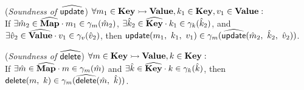 \begin{thm} \normalfont
(\textit{Soundness of} $\widehat{\textsf{update}}$) 
$\forall m_1 \in \textbf{Key} \rightarrowtail \textbf{Value}, k_1 \in \textbf{Key}, v_1 \in \textbf{Value} :$\\
If $\exists \hat{m}_2 \in \widehat{\textbf{Map}} \cdot m_1 \in \gamma_m(\hat{m}_2)$,
$\exists \hat{k}_2 \in \widehat{\textbf{Key}} \cdot k_1 \in \gamma_k(\hat{k}_2)$,
and $\exists \hat{v}_2 \in \widehat{\textbf{Value}} \cdot v_1 \in \gamma_v(\hat{v}_2)$,
then $\textsf{update}(m_1,\ k_1,\ v_1) \in \gamma_m(\widehat{\textsf{update}}(\hat{m}_2,\ \hat{k}_2,\ \hat{v}_2))$.
\end{thm}


\begin{thm} \normalfont
(\textit{Soundness of} $\widehat{\textsf{delete}}$) 
$\forall m \in \textbf{Key} \rightarrowtail \textbf{Value}, k \in \textbf{Key} :$\\
If $\exists \hat{m} \in \widehat{\textbf{Map}} \cdot m \in \gamma_m(\hat{m})$
and $\exists \hat{k} \in \widehat{\textbf{Key}} \cdot k \in \gamma_k(\hat{k})$,
then $\textsf{delete}(m,\ k) \in \gamma_m(\widehat{\textsf{delete}}(\hat{m},\ \hat{k}))$.
\end{thm}
